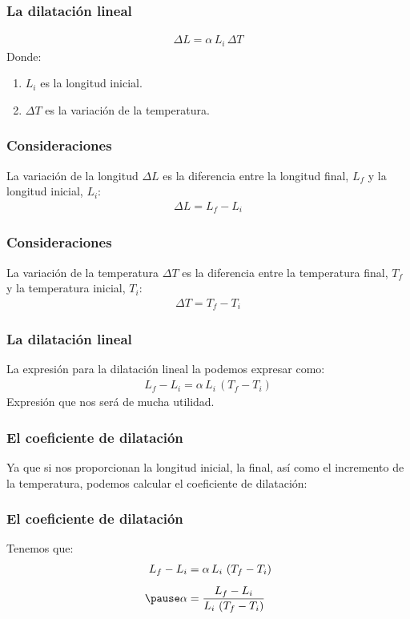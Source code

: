 \documentclass[14pt]{beamer}
\begin{document}
\begin{frame}
\frametitle{La dilatación lineal}
\vspace*{-1cm}
\begin{align*}
\Delta L = \alpha \, L_{i} \, \Delta T
\end{align*}
Donde:
\begin{enumerate}[<+->]
\conti
\item $L_{i}$ es la longitud inicial.
\item $\Delta T$ es la variación de la temperatura.
\end{enumerate}
\end{frame}
\begin{frame}
\frametitle{Consideraciones}
La variación de la longitud $\Delta L$ es la diferencia entre la longitud final, $L_{f}$ y la longitud inicial, $L_{i}$:
\pause
\begin{align*}
\Delta L = L_{f} - L_{i}
\end{align*}
\end{frame}
\begin{frame}
\frametitle{Consideraciones}
La variación de la temperatura $\Delta T$ es la diferencia entre la temperatura final, $T_{f}$ y la temperatura inicial, $T_{i}$:
\pause
\begin{align*}
\Delta T = T_{f} - T_{i}
\end{align*}
\end{frame}
\begin{frame}
\frametitle{La dilatación lineal}
La expresión para la dilatación lineal la podemos expresar como:
\pause
\begin{align*}
L_{f} - L_{i} = \alpha \, L_{i} \, \left( T_{f} - T_{i} \right)
\end{align*}
Expresión que nos será de mucha utilidad.
\end{frame}
\begin{frame}
\frametitle{El coeficiente de dilatación}
Ya que si nos proporcionan la longitud inicial, la final, así como el incremento de la temperatura, podemos calcular el coeficiente de dilatación:
\end{frame}
\begin{frame}
\frametitle{El coeficiente de dilatación}
Tenemos que:
\pause
\begin{eqnarray*}
\begin{aligned}
L_{f} - L_{i} &= \alpha \, L_{i} \, \left( T_{f} - T_{i} \right) \\[0.5em] \pause
\alpha &= \dfrac{L_{f} - L_{i}}{L_{i} \, \left( T_{f} - T_{i} \right)}
\end{aligned}
\end{eqnarray*}
\end{frame}
\end{document}
